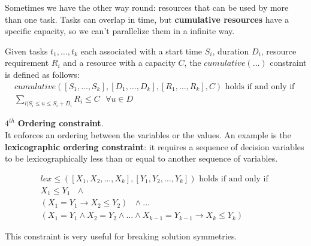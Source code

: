 Sometimes we have the other way round: resources that can be used by more than one task. Tasks can overlap in time, but \textbf{cumulative resources} have 
a specific capacity, so we can't parallelize them in a infinite way.
\begin{definition}[title = $\textit{cumulative}(\dots)$]
    Given tasks $t_1, \dots, t_k$ each associated with a start time $S_i$, duration $D_i$, resource requirement $R_i$ and a resource with a capacity $C$,
    the $\textit{cumulative}(\dots)$ constraint is defined as follows:
    $$
        \begin{gathered}
            \textit{cumulative}([S_1, \dots, S_k], [D_1, \dots, D_k], [R_1, \dots, R_k], C) \text{ holds if and only if } \\
            \sum_{i | S_i \leq u \leq S_i + D_i} R_i \leq C \text{ } \forall u \in D
        \end{gathered}
    $$
\end{definition}
$4^{th}$ \textbf{Ordering constraint}. \\
It enforces an ordering between the variables or the values. An example is the \textbf{lexicographic ordering constraint}: it requires a sequence of decision 
variables to be lexicographically less than or equal to another sequence of variables.
\begin{definition}[title = $\textit{lex}\leq(\dots)$]
    $$
        \begin{gathered}
            \textit{lex}\leq([X_1, X_2, \dots, X_k], [Y_1, Y_2, \dots, Y_k]) \text{ holds if and only if } \\
            X_1 \leq Y_1 \text{ } \wedge \\
            (X_1 = Y_1 \rightarrow X_2 \leq Y_2) \text{ } \wedge \dots \\
            (X_1 = Y_1 \wedge X_2 = Y_2 \wedge \dots \wedge X_{k-1} = Y_{k-1} \rightarrow X_k \leq Y_k)
        \end{gathered}
    $$
\end{definition}
This constraint is very useful for breaking solution symmetries.